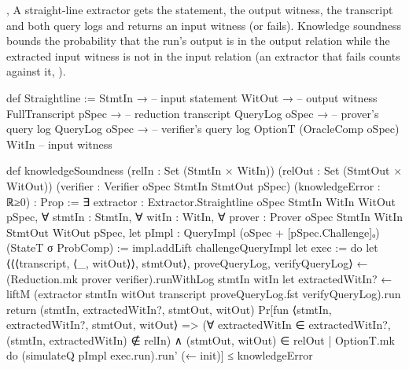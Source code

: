 
\begin{define}{, }
A straight-line extractor gets the statement, the output witness, the transcript and both query
logs and returns an input witness (or fails). Knowledge soundness bounds the probability that the
run's output is in the output relation while the extracted input witness is not in the input
relation (an extractor that fails counts against it, ).
\end{define}

\begin{leancode}
def Straightline :=
  StmtIn → -- input statement
  WitOut → -- output witness
  FullTranscript pSpec → -- reduction transcript
  QueryLog oSpec → -- prover's query log
  QueryLog oSpec → -- verifier's query log
  OptionT (OracleComp oSpec) WitIn -- input witness
\end{leancode}



\begin{leancode}
def knowledgeSoundness (relIn : Set (StmtIn × WitIn)) (relOut : Set (StmtOut × WitOut))
    (verifier : Verifier oSpec StmtIn StmtOut pSpec) (knowledgeError : ℝ≥0) : Prop :=
  ∃ extractor : Extractor.Straightline oSpec StmtIn WitIn WitOut pSpec,
  ∀ stmtIn : StmtIn,
  ∀ witIn : WitIn,
  ∀ prover : Prover oSpec StmtIn WitIn StmtOut WitOut pSpec,
    let pImpl : QueryImpl (oSpec + [pSpec.Challenge]ₒ) (StateT σ ProbComp) :=
      impl.addLift challengeQueryImpl
    let exec := do
      let ⟨⟨⟨transcript, ⟨_, witOut⟩⟩, stmtOut⟩, proveQueryLog, verifyQueryLog⟩
        ← (Reduction.mk prover verifier).runWithLog stmtIn witIn
      let extractedWitIn? ←
        liftM (extractor stmtIn witOut transcript proveQueryLog.fst verifyQueryLog).run
      return (stmtIn, extractedWitIn?, stmtOut, witOut)
    Pr[fun ⟨stmtIn, extractedWitIn?, stmtOut, witOut⟩ =>
        (∀ extractedWitIn ∈ extractedWitIn?, (stmtIn, extractedWitIn) ∉ relIn) ∧
          (stmtOut, witOut) ∈ relOut
      | OptionT.mk do (simulateQ pImpl exec.run).run' (← init)] ≤ knowledgeError
\end{leancode}


